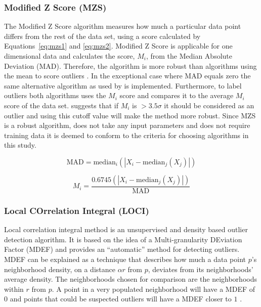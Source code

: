 \subsubsection{Modified Z Score (MZS)} 
The Modified Z Score algorithm measures how much a particular data point differs from the rest of the data set, using a score calculated by Equations~\ref{eq:mzs1} and \ref{eq:mzs2}. Modified Z Score is applicable for one dimensional data and calculates the score, $M_{i}$,  from the Median Absolute Deviation (MAD). Therefore, the algorithm is more robust than algorithms using the mean to score outliers \citep{garcia2012tests}. In the exceptional case where MAD equals zero the same alternative algorithm as used by \citet{ibm2007spss} is implemented. Furthermore, to label outliers both algorithms uses the $M_{i}$ score and compares it to the average $M_{i}$ score of the data set. \citet{iglewicz1993detect} suggests that if $M_{i}$ is $> 3.5\sigma$ it should be considered as an outlier and using this cutoff value will make the method more robust. Since MZS is a robust algorithm, does not take any input parameters and does not require training data it is deemed to conform to the criteria for choosing algorithms in this study.


\begin{equation}\label{eq:mzs1}
\mathrm{MAD} = \mathrm{median}_{i} (| X_{i} - \mathrm{median}_{j} (X_{j})| )
\end{equation}


\begin{equation}\label{eq:mzs2}
M_{i} = \frac{ 0.6745(| X_{i} - \mathrm{median}_{j} (X_{j})| )}{\mathrm{MAD}}
\end{equation}




\subsubsection{Local COrrelation Integral (LOCI) }
Local correlation integral method is an unsupervised and density based outlier detection algorithm. It is based on the idea of a Multi-granularity DEviation Factor (MDEF) and provides an ``automatic'' method for detecting outliers. MDEF can be explained as a technique that describes how much a data point $p$'s neighborhood density, on a distance $\alpha r$ from $p$, deviates from its neighborhoods' average density. The neighborhoods chosen for comparison are the neighborhoods within $r$ from $p$. A point in a very populated neighborhood will have a MDEF of $0$ and points that could be suspected outliers will have a MDEF closer to $1$ \citep{papadimitriou2003loci}.




